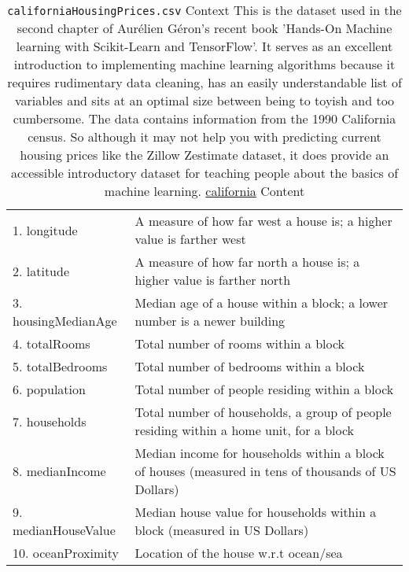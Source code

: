 \documentclass[12pt]{article}
\theoremstyle{remark}
\begin{document}
\begin{table}
	\caption{ \texttt{californiaHousingPrices.csv}
Context
This is the dataset used in the second chapter of Aurélien Géron's recent book 'Hands-On Machine learning with Scikit-Learn and TensorFlow'. It serves as an excellent introduction to implementing machine learning algorithms because it requires rudimentary data cleaning, has an easily understandable list of variables and sits at an optimal size between being to toyish and too cumbersome.
The data contains information from the 1990 California census. So although it may not help you with predicting current housing prices like the Zillow Zestimate dataset, it does provide an accessible introductory dataset for teaching people about the basics of machine learning.
\href{ https://www.kaggle.com/datasets/camnugent/california-housing-prices?select=housing.csv}{california} Content
}
	\begin{tabular}{l|l}\hline
1. longitude & A measure of how far west a house is; a higher value is farther west \\
2. latitude & A measure of how far north a house is; a higher value is farther north\\
3. housingMedianAge & Median age of a house within a block; a lower number is a newer building\\
4. totalRooms& Total number of rooms within a block\\
5. totalBedrooms & Total number of bedrooms within a block\\
6. population &  Total number of people residing within a block\\
7. households &  Total number of households, a group of people residing within a home unit, for a block \\
8. medianIncome &  Median income for households within a block of houses (measured in tens of thousands of US Dollars)\\
9. medianHouseValue &  Median house value for households within a block (measured in US Dollars)\\
10. oceanProximity & Location of the house w.r.t ocean/sea\\
	\hline
	\end{tabular}
\end{table}
%

\newpage
\end{document}
